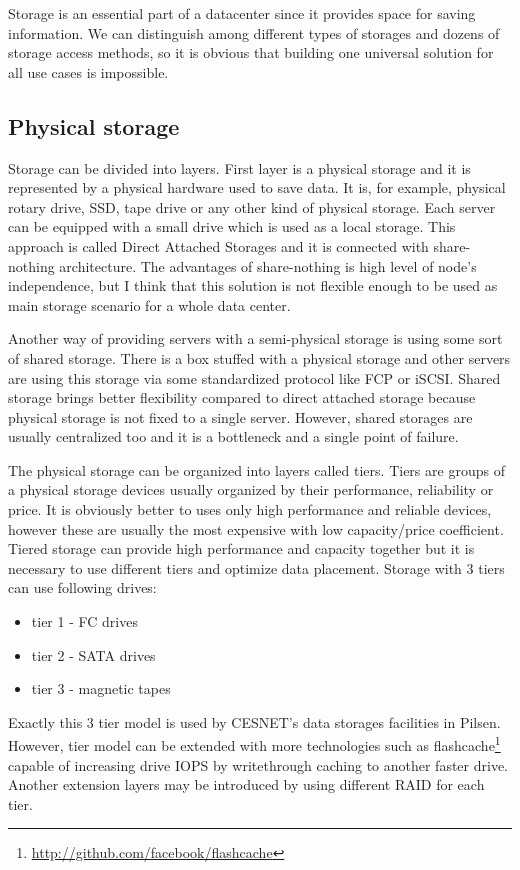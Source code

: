 

Storage is an essential part of a datacenter since it provides space for saving information. We can distinguish among different types of storages and dozens of storage access methods, so it is obvious that building one universal solution for all use cases is impossible. 

\subsection{Physical storage}
Storage can be divided into layers. First layer is a physical storage and it is represented by a physical hardware used to save data. It is, for example, physical rotary drive, \Ac{SSD}, tape drive or any other kind of physical storage. Each server can be equipped with a small drive which is used as a local storage. This approach is called Direct Attached Storages and it is connected with share-nothing architecture. The advantages of share-nothing is high level of node's independence, but I think that this solution is not flexible enough to be used as main storage scenario for a whole data center.

Another way of providing servers with a semi-physical storage is using some sort of shared storage. There is a box stuffed with a physical storage and other servers are using this storage via some standardized protocol like \Ac{FCP} or \Ac{iSCSI}. Shared storage brings better flexibility compared to direct attached storage because physical storage is not fixed to a single server. However, shared storages are usually centralized too and it is a bottleneck and a single point of failure.

The physical storage can be organized into layers called tiers. Tiers are groups of a physical storage devices usually organized by their performance, reliability or price. It is obviously better to uses only high performance and reliable devices, however these are usually the most expensive with low capacity/price coefficient. Tiered storage can provide high performance and capacity together but it is necessary to use different tiers and optimize data placement. Storage with 3 tiers can use following drives:
\begin{itemize}
	\item tier 1 - \Ac{FC} drives
	\item tier 2 - \Ac{SATA} drives
	\item tier 3 - magnetic tapes
\end{itemize}
Exactly this 3 tier model is used by CESNET's data storages facilities in Pilsen. However, tier model can be extended with more technologies such as flashcache\footnote{\url{http://github.com/facebook/flashcache}} capable of increasing drive \Ac{IOPS} by writethrough caching to another faster drive. Another extension layers may be introduced by using different \Ac{RAID} for each tier.

